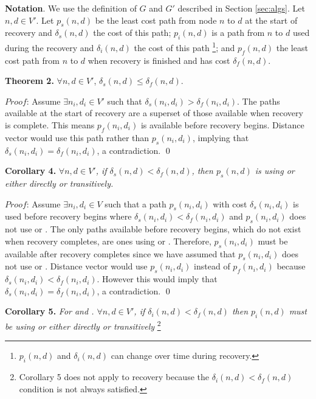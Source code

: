 {\bf Notation}. We use the definition of $G$ and $G'$ described in Section \ref{sec:algs}. 
Let $n,d \in V'$. Let $p_s(n,d)$ be the least cost path from node $n$ to $d$ at the start of recovery and $\delta_s(n,d)$ the
cost of this path; $p_i(n,d)$ is a path from $n$ to $d$ used during the recovery 
and $\delta_i(n,d)$ the cost of this path 
{\footnote {\small $p_i(n,d)$ and $\delta_i(n,d)$ can change over time during recovery.}}; and $p_f(n,d)$ the least cost path from $n$ to $d$ 
when recovery is finished and has cost $\delta_f(n,d)$.  %


{\bf Theorem 2.} $\forall n,d\in V'$, $ \delta_s(n,d) \leq \delta_f(n,d)$.

$Proof$: Assume $\exists n_i,d_i\in V'$ such that $\delta_s(n_i,d_i) > \delta_f(n_i,d_i)$.  The paths available at the start of recovery are a superset of 
those available when recovery is complete. This means $p_f(n_i,d_i)$ is available before recovery begins. Distance vector would use this path rather
than $p_s(n_i,d_i)$, implying that $\delta_s(n_i,d_i)=\delta_f(n_i,d_i)$, a contradiction. \qed

{\bf Corollary 4.} {\it $\forall n,d\in V'$, if $\delta_s(n,d) < \delta_f(n,d)$, then $p_s(n,d)$ is using \badvector or \oldvector either directly or transitively.}

$Proof$:  Assume $\exists n_i,d_i\in V$ such that a path $p_{s}(n_i,d_i)$ with cost $\delta_{s}(n_i,d_i)$ is used before recovery begins where
$\delta_{s}(n_i,d_i) < \delta_f(n_i,d_i)$ and  $p_{s}(n_i,d_i)$ does not use \badvector or \oldvectors.  The only paths available before recovery begins, which do not 
exist when recovery completes, are ones using \badvector or \oldvectors. Therefore, $p_{s}(n_i,d_i)$ must be available after recovery completes since we have assumed that
$p_{s}(n_i,d_i)$ does not use \badvector or \oldvector. Distance vector would use  $p_{s}(n_i,d_i)$ instead of $p_f(n_i,d_i)$ because 
$\delta_{s}(n_i,d_i) < \delta_f(n_i,d_i)$.  However this would 
imply that $\delta_{s}(n_i,d_i)= \delta_f(n_i,d_i)$, a contradiction. \qed

{\bf Corollary 5.} {\it For \second and \cprs. $\forall n,d\in V'$, if $\delta_i(n,d) < \delta_f(n,d)$ 
  then $p_i(n,d)$  must be using \badvector or \oldvector either directly or transitively} 
 {\footnote {\small Corollary 5 does not apply to \purge recovery because the  $\delta_i(n,d) < \delta_f(n,d)$ condition is not always satisfied.}} 

